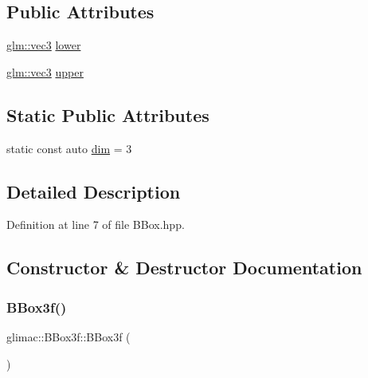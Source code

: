 \subsection*{Public Attributes}
\begin{DoxyCompactItemize}
\item 
\hyperlink{group__core__types_ga1c47e8b3386109bc992b6c48e91b0be7}{glm\+::vec3} \hyperlink{structglimac_1_1_b_box3f_a6416c303ada3a2433fb742021e021c27}{lower}
\item 
\hyperlink{group__core__types_ga1c47e8b3386109bc992b6c48e91b0be7}{glm\+::vec3} \hyperlink{structglimac_1_1_b_box3f_a5446e619162abd8011cab858f98d1954}{upper}
\end{DoxyCompactItemize}
\subsection*{Static Public Attributes}
\begin{DoxyCompactItemize}
\item 
static const auto \hyperlink{structglimac_1_1_b_box3f_aaf33ad923efc665e09a02895f19a8722}{dim} = 3
\end{DoxyCompactItemize}


\subsection{Detailed Description}


Definition at line 7 of file B\+Box.\+hpp.



\subsection{Constructor \& Destructor Documentation}
\mbox{\label{structglimac_1_1_b_box3f_ad465498ccf0a9b58990864bbc229ea5c}} 
\subsubsection{\texorpdfstring{B\+Box3f()}{BBox3f()}\hspace{0.1cm}{\footnotesize\ttfamily [1/4]}}
{\footnotesize\ttfamily glimac\+::\+B\+Box3f\+::\+B\+Box3f (\begin{DoxyParamCaption}{ }\end{DoxyParamCaption})\hspace{0.3cm}{\ttfamily [inline]}}



